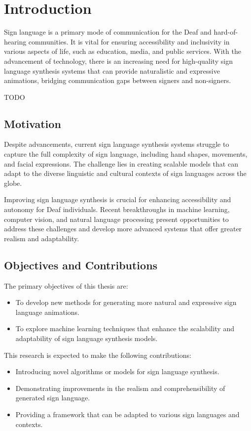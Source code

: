 \documentclass[../../main.tex]{subfiles}
\begin{document}
\chapter{Introduction}
\label{ch:introduction}

Sign language is a primary mode of communication for the Deaf and hard-of-hearing communities. It is vital for ensuring accessibility and inclusivity in various aspects of life, such as education, media, and public services. With the advancement of technology, there is an increasing need for high-quality sign language synthesis systems that can provide naturalistic and expressive animations, bridging communication gaps between signers and non-signers.

TODO

\section{Motivation}
Despite advancements, current sign language synthesis systems struggle to capture the full complexity of sign language, including hand shapes, movements, and facial expressions. The challenge lies in creating scalable models that can adapt to the diverse linguistic and cultural contexts of sign languages across the globe.

Improving sign language synthesis is crucial for enhancing accessibility and autonomy for Deaf individuals. Recent breakthroughs in machine learning, computer vision, and natural language processing present opportunities to address these challenges and develop more advanced systems that offer greater realism and adaptability.

\section{Objectives and Contributions}

The primary objectives of this thesis are:
\begin{itemize}
    \item To develop new methods for generating more natural and expressive sign language animations.
    \item To explore machine learning techniques that enhance the scalability and adaptability of sign language synthesis models.
\end{itemize}

This research is expected to make the following contributions:
\begin{itemize}
    \item Introducing novel algorithms or models for sign language synthesis.
    \item Demonstrating improvements in the realism and comprehensibility of generated sign language.
    \item Providing a framework that can be adapted to various sign languages and contexts.
\end{itemize}
\end{document}
